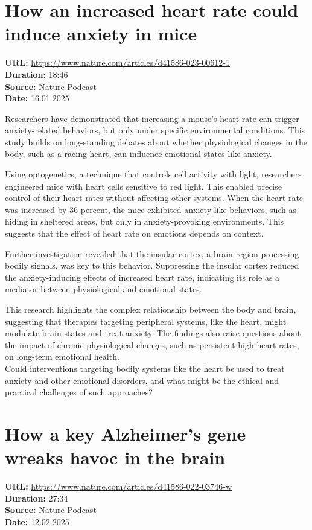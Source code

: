 \documentclass[12pt]{article}
\begin{document}
\section{How an increased heart rate could induce anxiety in mice}
\textbf{URL:} \url{https://www.nature.com/articles/d41586-023-00612-1}\\
\textbf{Duration:} 18:46\\
\textbf{Source:} Nature Podcast\\
\textbf{Date:} 16.01.2025
 

Researchers have demonstrated that increasing a mouse's heart rate can trigger anxiety-related behaviors, but only under specific environmental conditions. This study builds on long-standing debates about whether physiological changes in the body, such as a racing heart, can influence emotional states like anxiety.  

Using optogenetics, a technique that controls cell activity with light, researchers engineered mice with heart cells sensitive to red light. This enabled precise control of their heart rates without affecting other systems. When the heart rate was increased by 36 percent, the mice exhibited anxiety-like behaviors, such as hiding in sheltered areas, but only in anxiety-provoking environments. This suggests that the effect of heart rate on emotions depends on context.  

Further investigation revealed that the insular cortex, a brain region processing bodily signals, was key to this behavior. Suppressing the insular cortex reduced the anxiety-inducing effects of increased heart rate, indicating its role as a mediator between physiological and emotional states.  

This research highlights the complex relationship between the body and brain, suggesting that therapies targeting peripheral systems, like the heart, might modulate brain states and treat anxiety. The findings also raise questions about the impact of chronic physiological changes, such as persistent high heart rates, on long-term emotional health.\\[5px]  

Could interventions targeting bodily systems like the heart be used to treat anxiety and other emotional disorders, and what might be the ethical and practical challenges of such approaches?  





\newpage

\section{How a key Alzheimer’s gene wreaks havoc in the brain}
\textbf{URL:} \url{https://www.nature.com/articles/d41586-022-03746-w}\\
\textbf{Duration:} 27:34\\
\textbf{Source:} Nature Podcast\\
\textbf{Date:} 12.02.2025
\end{document}
